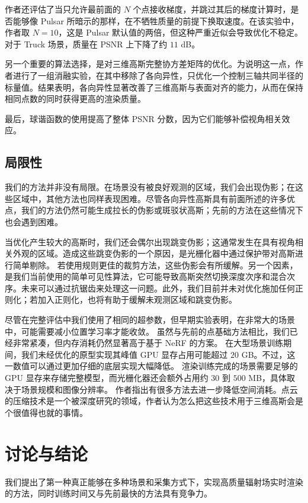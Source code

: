 作者还评估了当只允许最前面的 \(N\) 个点接收梯度，并跳过其后的梯度计算时，是否能够像 Pulsar 所暗示的那样，在不牺牲质量的前提下换取速度。在该实验中，作者取 \(N=10\)，这是 Pulsar 默认值的两倍，但这种严重近似会导致优化不稳定。对于 Truck 场景，质量在 PSNR 上下降了约 \(11\) dB。

另一个重要的算法选择，是对三维高斯完整协方差矩阵的优化。为说明这一点，作者进行了一组消融实验，在其中移除了各向异性，只优化一个控制三轴共同半径的标量值。结果表明，各向异性显著改善了三维高斯与表面对齐的能力，从而在保持相同点数的同时获得更高的渲染质量。

最后，球谐函数的使用提高了整体 PSNR 分数，因为它们能够补偿视角相关效应。

\subsection{局限性}

我们的方法并非没有局限。在场景没有被良好观测的区域，我们会出现伪影；在这些区域中，其他方法也同样表现困难。尽管各向异性高斯具有前面所述的许多优点，我们的方法仍然可能生成拉长的伪影或斑驳状高斯；先前的方法在这些情况下也会遇到困难。

当优化产生较大的高斯时，我们还会偶尔出现跳变伪影；这通常发生在具有视角相关外观的区域。造成这些跳变伪影的一个原因，是光栅化器中通过保护带对高斯进行简单剔除。
若使用规则更佳的裁剪方法，这些伪影会有所缓解。另一个因素，是我们当前使用的简单可见性算法，它可能导致高斯突然切换深度次序和混合次序。未来可以通过抗锯齿来处理这一问题。此外，我们目前并未对优化施加任何正则化；若加入正则化，也将有助于缓解未观测区域和跳变伪影。

尽管在完整评估中我们使用了相同的超参数，但早期实验表明，在非常大的场景中，可能需要减小位置学习率才能收敛。
虽然与先前的点基础方法相比，我们已经非常紧凑，但内存消耗仍然显著高于基于 NeRF 的方案。
在大型场景训练期间，我们未经优化的原型实现其峰值 GPU 显存占用可能超过 \(20\) GB。不过，这一数值可以通过更加仔细的底层实现大幅降低。
渲染训练完成的场景需要足够的 GPU 显存来存储完整模型，而光栅化器还会额外占用约 \(30\) 到 \(500\) MB，具体取决于场景规模和图像分辨率。
作者指出有很多方法去进一步降低空间消耗。点云的压缩技术是一个被深度研究的领域，作者认为怎么把这些技术用于三维高斯会是个很值得也就的事情。

\section{讨论与结论}

我们提出了第一种真正能够在多种场景和采集方式下，实现高质量辐射场实时渲染的方法，同时训练时间又与先前最快的方法具有竞争力。

